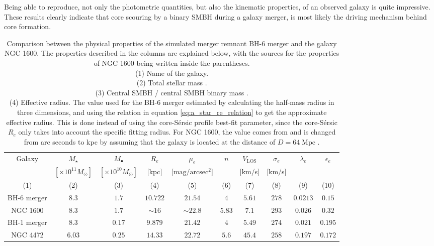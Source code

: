 \documentclass[english, oneside]{HYgradu}
\begin{document}
Being able to reproduce, not only the photometric quantities, but also the kinematic properties, of an observed galaxy is quite impressive. These results clearly indicate that core scouring by a binary SMBH during a galaxy merger, is most likely the driving mechanism behind core formation.

\begin{table}
	\begin{center}
		\scriptsize
		\begin{tabular}{c c c c c c c c c c}
		\hline
		\hline
		Galaxy & $M_\star$ & $M_\bullet$ & $R_e$ & $\mu_e$ & $n$ & 
		$V_\mathrm{LOS}$ & $\sigma_e$ & $\lambda_e$ &
		$\epsilon_e$ \\
		& $[\times 10^{11} M_\odot]$ & $[\times 10^{10} M_\odot]$ &
		[kpc] & [$\mathrm{mag/arcsec^2}$] & & [km/s] & [km/s] & & \\
		(1) & (2) & (3) & (4) & (5) & (6) & (7) & (8) & (9) & (10) \\
		\hline
		BH-6 merger & $8.3$ & $1.7$ & $10.722$ & $21.54$ & $4$ & $5.61$ & $278$ & $0.0213$ & $0.15$ \\
		NGC 1600 & $8.3$ & $1.7$ & $\sim 16$ & $\sim 22.8$ & $5.83$ & $7.1$ & $293$ & $0.026$ & $0.32$ \\
		\hdashline
		BH-1 merger & $8.3$ & $0.17$ & $9.879$ & $21.42$ & $4$ & $5.49$ & $274$ & $0.021$ & $0.195$ \\
		NGC 4472 & $6.03$ & $0.25$ & $14.33$ & $22.72$ & $5.6$ & $45.4$ & 
		$258$ & $0.197$ & $0.172$ \\
		\hline
		\end{tabular}
	\end{center}
	\caption{Comparison between the physical properties of the simulated merger remnant BH-6 merger and the galaxy NGC 1600. The properties described in the columns are explained below, with the sources for the properties of NGC 1600 being written inside the parentheses. \\
	(1) Name of the galaxy. \\
	(2) Total stellar mass \citep{Thomas2016}. \\
	(3) Central SMBH / central SMBH binary mass \citep{Thomas2016}. \\
	(4) Effective radius. The value used for the BH-6 merger estimated by calculating the half-mass radius in three dimensions, and using the relation in equation \ref{eq:a_star_re_relation} to get the approximate effective radius. This is done instead of using the core-Sérsic profile best-fit parameter, since the core-Sérsic $R_e$ only takes into account the specific fitting radius. For NGC 1600, the value comes from \cite{Thomas2016} and is changed from arc seconds to kpc by assuming that the galaxy is located at the distance of $D = 64 \; \mathrm{Mpc}$ \citep{Thomas2016}. \\
}
\end{table}
\end{document}
